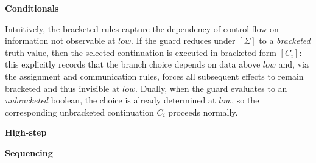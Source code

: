 \documentclass[12pt,a4paper,twoside]{book}
\begin{document}
\noindent\textbf{Conditionals}
\begin{mathpar}



\end{mathpar}

Intuitively, the bracketed rules capture the dependency of control flow on information not observable at \(low\). If the guard reduces under \([\Sigma]\) to a \emph{bracketed} truth value, then the selected continuation is executed in bracketed form \([C_i]\): this explicitly records that the branch choice depends on data above \(low\) and, via the assignment and communication rules, forces all subsequent effects to remain bracketed and thus invisible at \(low\). Dually, when the guard evaluates to an \emph{unbracketed} boolean, the choice is already determined at \(low\), so the corresponding unbracketed continuation \(C_i\) proceeds normally.

\noindent\textbf{High-step}
\begin{mathpar}

\end{mathpar}

\noindent\textbf{Sequencing}
\begin{mathpar}

\end{mathpar}
\end{document}
